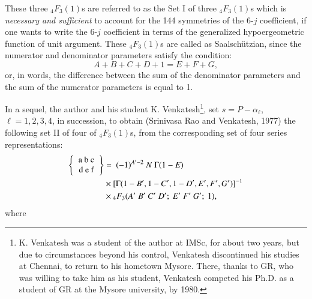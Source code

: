 These three ${}_4F_3(1)$s are referred to as the Set I of three ${}_4F_3(1)$s which is \textit{necessary and sufficient} to account for the 144 symmetries of the 6-$j$ coefficient, if one wants to write the 6-$j$ coefficient in terms of the generalized hypoergeometric function of unit argument. These ${}_4F_3(1)$s are called as Saalschützian, since the numerator and denominator parameters satisfy the condition:
\begin{equation}
A+B+C+D+1 = E+F+G, \label{chap7-eq36}
\end{equation}
or, in words, the difference between the sum of the denominator parameters and the sum of the numerator parameters is equal to 1.

In a sequel, the author and his student K. Venkatesh\footnote{K. Venkatesh was a student of the author at IMSc, for about two years, but due to circumstances beyond his control, Venkatesh discontinued his studies at Chennai, to return to his hometown Mysore. There, thanks to GR, who was willing to take him as his student, Venkatesh competed his Ph.D. as a student of GR at the Mysore university, by 1980.}, set $s = P-\alpha_\ell$, $\ell=1,2,3,4$, in succession, to obtain (Srinivasa Rao and Venkatesh, 1977) the following set II of four of $_4F_3(1)$s, from the corresponding set of four series representations:
\begin{equation}
\begin{split}
\left\{
\begin{tabular} {c} 
a\ b\ c\\ 
d\ e\ f \\ 
\end{tabular} 
\right\}
& = \ (-1)^{A'-2}\ N\ \Gamma(1-E)\\
& \times [\Gamma(1-B', 1-C', 1-D', E', F', G')]^{-1}\\
& \times {}_4F_3(A'\ B'\ C'\ D';\ E'\ F'\ G';\ 1), \label{chap7-eq37}
\end{split}
\end{equation}
where
